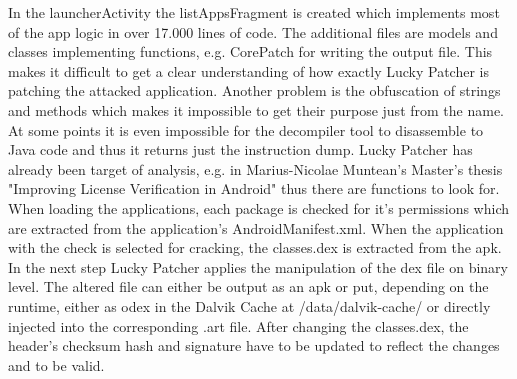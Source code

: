 In the launcherActivity the listAppsFragment is created which implements most of the app logic in over 17.000 lines of code.
The additional files are models and classes implementing functions, e.g. CorePatch for writing the output file.
This makes it difficult to get a clear understanding of how exactly Lucky Patcher is patching the attacked application.
Another problem is the obfuscation of strings and methods which makes it impossible to get their purpose just from the name.
At some points it is even impossible for the decompiler tool to disassemble to Java code and thus it returns just the instruction dump.
\newline
Lucky Patcher has already been target of analysis, e.g. in Marius-Nicolae Muntean's Master's thesis "Improving License Verification in Android" \cite{munteanLicense}
thus there are functions to look for.
When loading the applications, each package is checked for it's permissions which are extracted from the application's AndroidManifest.xml.
When the application with the check is selected for cracking, the classes.dex is extracted from the \gls{apk}.
In the next step Lucky Patcher applies the manipulation of the \gls{dex} file on binary level.
The altered file can either be output as an \gls{apk} or put, depending on the runtime, either as \gls{odex} in the Dalvik Cache at /data/dalvik-cache/ or directly injected into the corresponding .art file.
After changing the classes.dex, the header's checksum hash and signature have to be updated to reflect the changes and to be valid.
\cite{munteanLicense}
%
